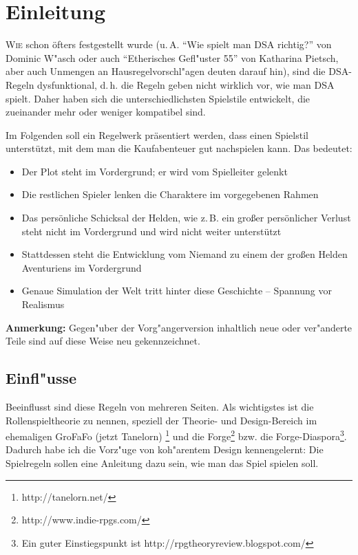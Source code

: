 \chapter{Einleitung}

\lettrine[findent=1em,nindent=-0.4em]{W}{ie} schon öfters festgestellt wurde (u.\,A. ``Wie spielt man DSA richtig?'' von Dominic W"asch oder auch ``Etherisches Gefl"uster 55'' von Katharina Pietsch, aber auch Unmengen an Hausregelvorschl"agen deuten darauf hin), sind die DSA-Regeln dysfunktional, d.\,h. die Regeln geben nicht wirklich vor, wie man DSA spielt. Daher haben sich die unterschiedlichsten Spielstile entwickelt, die zueinander mehr oder weniger kompatibel sind.

Im Folgenden soll ein Regelwerk präsentiert werden, dass einen Spielstil unterstützt, mit dem man die Kaufabenteuer gut nachspielen kann. Das bedeutet:
\begin{itemize}
  \item Der Plot steht im Vordergrund; er wird vom Spielleiter gelenkt
  \item Die restlichen Spieler lenken die Charaktere im vorgegebenen Rahmen
  \item Das persönliche Schicksal der Helden, wie z.\,B. ein großer persönlicher Verlust steht nicht im Vordergrund und wird nicht weiter unterstützt
  \item Stattdessen steht die Entwicklung vom Niemand zu einem der großen Helden Aventuriens im Vordergrund
  \item Genaue Simulation der Welt tritt hinter diese Geschichte -- Spannung vor Realismus
\end{itemize}


\textbf{Anmerkung:} Gegen"uber der Vorg"angerversion inhaltlich neue oder ver"anderte Teile sind auf diese Weise neu gekennzeichnet.

\section{Einfl"usse}
Beeinflusst sind diese Regeln von mehreren Seiten. Als wichtigstes ist die Rollenspieltheorie zu nennen, speziell der Theorie- und Design-Bereich im ehemaligen GroFaFo (jetzt Tanelorn) \footnote{{http://tanelorn.net/}} und die Forge\footnote{{http://www.indie-rpgs.com/}} bzw. die Forge-Diaspora\footnote{Ein guter Einstiegspunkt ist {http://rpgtheoryreview.blogspot.com/}}. Dadurch habe ich die Vorz"uge von koh"arentem Design kennengelernt: Die Spielregeln sollen eine Anleitung dazu sein, wie man das Spiel spielen soll.

